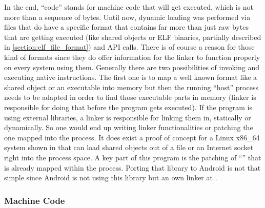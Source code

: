 In the end, ``code'' stands for machine code that will get executed, which is not more
than a sequence of bytes. Until now, dynamic loading was performed via files that do have a specific format that contains far more than just raw bytes that are getting
executed (like shared objects or ELF binaries, partially described in 
\autoref{section:elf_file_format}) and API calls. There is of course a reason for those kind of formats since they do offer information for the linker to function properly on every system using them. Generally there are two possibilities of invoking and executing
native instructions.
The first one is to map a well known format like a shared object or an executable
into memory but then the running ``host'' process needs to be adapted in order to find those executable parts in memory (linker is responsible for doing that before the program gets executed).
If the program is using external libraries, a linker is responsible for linking them in, statically or dynamically. So one would end up writing linker
functionalities or patching the one mapped into the process. It does exist a proof of concept for a Linux x86\_64 system shown in \parencite{memdlopen} that can load 
shared objects out of a file or an Internet socket right into the process space.
A key part of this program is the patching of ``'' that is already mapped within the process. Porting that library to Android is not that simple since Android is not using this library but an own linker at .


\subsubsection{Machine Code}

